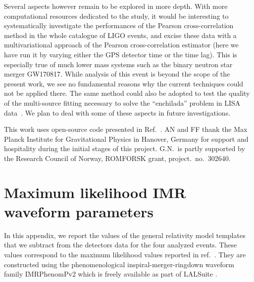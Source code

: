 \documentclass[a4paper,11pt]{article}
\begin{document}
Several aspects however remain to be explored in more depth. With more computational resources dedicated to the study, it would be interesting to systematically investigate the performances of the Pearson cross-correlation method in the whole catalogue of LIGO events, and excise these data with a multivariational approach of the Pearson cross-correlation estimator (here we have run it by varying either the GPS detector time or the time lag). This is especially true of much lower mass systems such as the binary neutron star merger GW170817. While analysis of this event is beyond the scope of the present work, we see no fundamental reasons why the current techniques could not be applied there. The same method could also be adopted to test the quality of the multi-source fitting necessary to solve the ``enchilada'' problem in LISA data~\cite{Babak:2017cjl}. We plan to deal with some of these aspects in future investigations.

\acknowledgments
This work uses open-source code presented in Ref.~\cite{Nielsen:2018bhc}. AN and FF thank the Max Planck Institute for Gravitational Physics in Hanover, Germany for support and hospitality during the initial stages of this project. G.N.~is partly supported by the Research Council of Norway, ROMFORSK grant, project.~no.~302640.

\appendix

\section{Maximum likelihood IMR waveform parameters}


 In this appendix, we report the values of the general relativity model templates that we subtract from the detectors data for the four analyzed events. These values correspond to the maximum likelihood values reported in ref.~\cite{Biwer:2018osg}.
 They are constructed using the phenomenological inspiral-merger-ringdown waveform family IMRPhenomPv2 \cite{Hannam:2013oca} which is freely available as part of LALSuite \cite{LALsuite}.
\end{document}
